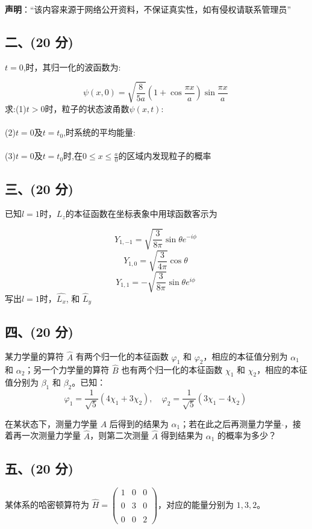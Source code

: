 
\textbf{声明}：“该内容来源于网络公开资料，不保证真实性，如有侵权请联系管理员”

\subsection{二、(20 分)}
 \( t = 0 \),时，其归一化的波函数为:

\[
\psi(x,0) = \sqrt{\frac{8}{5a}} (1 + \cos\frac{\pi x}{a}) \sin\frac{\pi x}{a}~
\]
求:(1)$t>0$时，粒子的状态波甬数$\psi(x,t)$:\\\\
(2)$t=0$及$t=t_0$,时系统的平均能量:\\\\
(3)$t=0$及$t=t_0$时,在$0\leq x\leq \frac{a}{0}$的区域内发现粒子的概率
\subsection{三、(20 分)}
已知$l=1$时，$L_z$的本征函数在坐标表象中用球函数客示为

\[Y_{1,-1} = \sqrt{\frac{3}{8\pi}} \sin \theta e^{-i\phi}~
\]
\[
Y_{1,0} = \sqrt{\frac{3}{4\pi}} \cos \theta~
\]
\[
Y_{1,1} = -\sqrt{\frac{3}{8\pi}} \sin \theta e^{i\phi}~
\]
写出$l=1$时，$\hat{L_x}$, 和 $\hat{L}_y $
\subsection{四、(20 分)}
某力学量的算符 $\hat{A}$ 有两个归一化的本征函数 $\varphi_1$ 和 $\varphi_2$，相应的本征值分别为 $\alpha_1$ 和 $\alpha_2$；另一个力学量的算符 $\hat{B}$ 也有两个归一化的本征函数 $\chi_1$ 和 $\chi_2$，相应的本征值分别为 $\beta_1$ 和 $\beta_2$。已知：
$$\varphi_1 = \frac{1}{\sqrt{5}} (4 \chi_1 + 3 \chi_2), \quad \varphi_2 = \frac{1}{\sqrt{5}} (3 \chi_1 - 4 \chi_2)~$$

在某状态下，测量力学量 $A$ 后得到的结果为 $\alpha_1$；若在此之后再测量力学量 $\hat{}$，接着再一次测量力学量 $\hat{A}$，则第二次测量 $\hat{A}$ 得到结果为 $\alpha_1$ 的概率为多少？
\subsection{五、(20 分)}
某体系的哈密顿算符为 $\hat{H} = \begin{pmatrix} 1 & 0 & 0 \\\\ 0 & 3 & 0 \\\\ 0 & 0 & 2 \end{pmatrix}$，对应的能量分别为 $1, 3, 2$。

